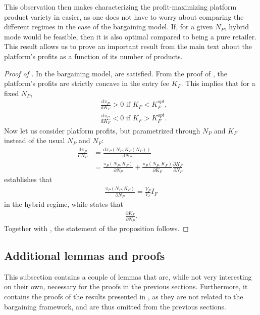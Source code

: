 \documentclass[a4paper]{article}
\newcommand{\dd}{\mathrm{d}}
\begin{document}
This observation then makes characterizing the profit-maximizing platform product variety in  easier, as one does not have to worry about comparing the different regimes in the case of the bargaining model.
If, for a given $N_P$, hybrid mode would be feasible, then it is also optimal compared to being a pure retailer.
This result allows us to prove an important result from the main text about the platform's profits as a function of its number of products.
\begin{proof}[Proof of ]
    In the bargaining model,  are satisfied.
    From the proof of , the platform's profits are strictly concave in the entry fee $K_F$.
    This implies that for a fixed $N_P$,
    \begin{align}
        &\frac{\dd \pi_P}{\dd K_F} > 0 \text{ if } K_F < K_F^{opt}, \nonumber \\
        &\frac{\dd \pi_P}{\dd K_F} < 0 \text{ if } K_F > K_F^{opt}. \label{eq:profit_on_entry_fee}
    \end{align}
    Now let us consider platform profits, but parametrized through $N_P$ and $K_F$ instead of the usual $N_P$ and $N_F$:
    \begin{align*}
        \frac{\dd \pi_P}{\dd N_P} &= \frac{\dd \pi_P(N_P, K_F(N_P))}{\dd N_P} \\
        &= \frac{\pi_P(N_P, K_F)}{\partial N_P} + \frac{\pi_P(N_P, K_F)}{\partial K_F} \frac{\partial K_F}{\partial N_P}.
    \end{align*}
     establishes that
    \begin{align*}
        \frac{\pi_P(N_P, K_F)}{\partial N_P} = \frac{V_P}{V_F} I_F
    \end{align*}
    in the hybrid regime, while  states that
    \begin{align*}
        \frac{\partial K_F}{\partial N_P}.
    \end{align*}
    Together with , the statement of the proposition follows.
\end{proof}


\subsection{Additional lemmas and proofs}
\label{sec:lemmas}
This subsection contains a couple of lemmas that are, while not very interesting on their own, necessary for the proofs in the previous sections.
Furthermore, it contains the proofs of the results presented in , as they are not related to the bargaining framework, and are thus omitted from the previous sections.
\end{document}
